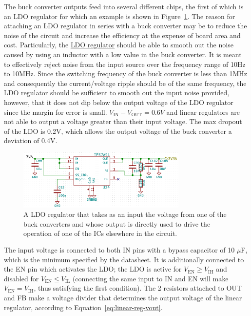 The buck converter outputs feed into several different chips, the first of which is an LDO regulator
for which an example is shown in Figure~\ref{fig:linear-reg}. The reason for attaching an LDO
regulator in series with a buck converter may be to reduce the noise of the circuit and increase the
efficiency at the expense of board area and cost. Particularly, the
\href{http://www.ti.com/lit/ds/symlink/tps7a91.pdf}{LDO regulator} should be able to smooth out the
noise caused by using an inductor with a low value in the buck converter. It is meant to effectively
reject noise from the input source over the frequency range of 10Hz to 10MHz. Since the switching
frequency of the buck converter is less than 1MHz and consequently the current/voltage ripple should
be of the same frequency, the LDO regulator should be sufficient to smooth out the input noise
provided, however, that it does not dip below the output voltage of the LDO regulator since the
margin for error is small. $V_{\text{IN}}-V_{\text{OUT}}=0.6V$ and linear regulators are not able to
output a voltage greater than their input voltage. The max dropout of the LDO is 0.2V, which allows
the output voltage of the buck converter a deviation of 0.4V.

\begin{figure}[h]
        \centering
        \includegraphics[width=0.75\textwidth]{data/linear-reg.png}
        \caption{A LDO regulator that takes as an input the voltage from one of the buck converters and
          whose output is directly used to drive the operation of one of the ICs elsewhere in the
          circuit.}
        \label{fig:linear-reg}
\end{figure}

The input voltage is connected to both IN pins with a bypass capacitor of 10 $\mu$F, which is the
minimum specified by the datasheet. It is additionally connected to the EN pin which activates the
LDO; the LDO is active for $V_{\text{EN}} \geq V_{\text{IH}}$ and disabled for
$V_{\text{EN}} \leq V_{\text{IL}}$ (connecting the same input to IN and EN will make
$V_{\text{EN}} = V_{\text{IH}}$, thus satisfying the first condition). The 2 resistors attached to
OUT and FB make a voltage divider that determines the output voltage of the linear regulator,
according to Equation~\ref{eq:linear-reg-vout}.


